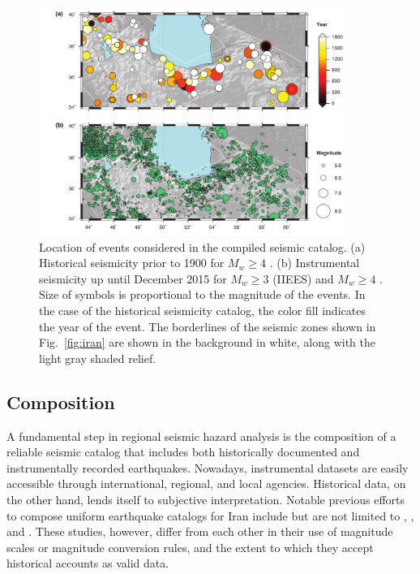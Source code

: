 
\begin{figure}[t] 
	\centering
	\includegraphics[width=0.9\textwidth]{figures/pdf/figure-03}
	\caption{Location of events considered in the compiled seismic catalog. (a) Historical seismicity prior to 1900 for $M_w \geq 4$ \citep[after][]{Zare2014}. (b) Instrumental seismicity up until December 2015 for $M_w \geq 3$ (IIEES) and $M_w \geq 4$ \citep[after][]{Zare2014}. Size of symbols is proportional to the magnitude of the events. In the case of the historical seismicity catalog, the color fill indicates the year of the event. The borderlines of the seismic zones shown in Fig.~\ref{fig:iran} are shown in the background in white, along with the light gray shaded relief.}
	\label{fig:catalog}
\end{figure}

\subsection{Composition}

A fundamental step in regional seismic hazard analysis is the composition of a reliable seismic catalog that includes both historically documented and instrumentally recorded earthquakes. Nowadays, instrumental datasets are easily accessible through international, regional, and local agencies. Historical data, on the other hand, lends itself to subjective interpretation. Notable previous efforts to compose uniform earthquake catalogs for Iran include but are not limited to \citet{Ambraseys_1982_Book}, \citet{moinfar1994}, and \citet{Berberian_1995_Tech}. These studies, however, differ from each other in their use of magnitude scales or magnitude conversion rules, and the extent to which they accept historical accounts as valid data. 

